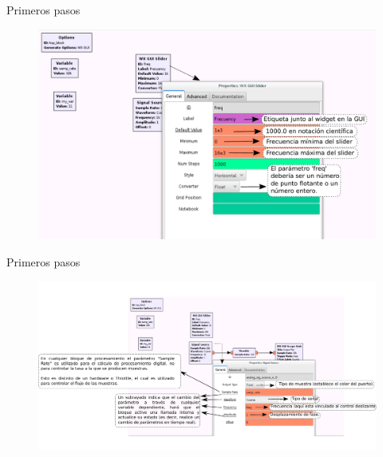 \begin{frame}{Primeros pasos }
\begin{figure}[H]
\vspace{-3mm}
\centering
\includegraphics[width=\textwidth]{parte1/lab1/pdf/lab1_13.pdf}
\end{figure}
\end{frame}

\begin{frame}{Primeros pasos }
\begin{figure}[H]
\vspace{-1cm}
\centering
\includegraphics[width=1.05\textwidth]{parte1/lab1/pdf/lab1_14.pdf}
\end{figure}
\end{frame}

